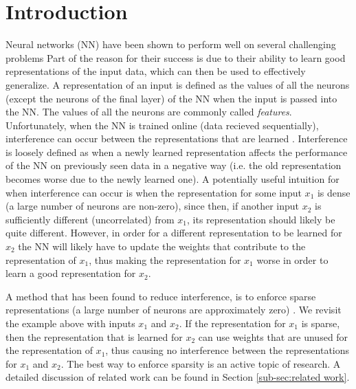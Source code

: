\documentclass{article}
\begin{document}
\section{Introduction} \label{sec:intro}
Neural networks (NN) have been shown to perform well on several challenging problems \cite{brown2020language,krizhevsky2017imagenet,mnih2013playing,silver2017mastering}
Part of the reason for their success is due to their ability to learn good representations of the input data, which can then be used to effectively generalize.
A representation of an input is defined as the values of all the neurons (except the neurons of the final layer) of the NN when the input is passed into the NN.
The values of all the neurons are commonly called \textit{features}.
Unfortunately, when the NN is trained online (data recieved sequentially), interference can occur between the representations that are learned \cite[]{chandak2019learning,caselles2018continual,madjiheurem2019representation}.
Interference is loosely defined as when a newly learned representation affects the performance of the NN on previously seen data in a negative way (i.e. the old representation becomes worse due to the newly learned one).
A potentially useful intuition for when interference can occur is when the representation for some input $x_1$ is dense (a large number of neurons are non-zero),
since then, if another input $x_2$ is sufficiently different (uncorrelated) from $x_1$, its representation should likely be quite different.
However, in order for a different representation to be learned for $x_2$ the NN will likely have to update the weights that contribute to the representation of $x_1$,
thus making the representation for $x_1$ worse in order to learn a good representation for $x_2$.

A method that has been found to reduce interference, is to enforce sparse representations (a large number of neurons are approximately zero) \cite[]{liu2019,javed2019,rafati2019learning}.
We revisit the example above with inputs $x_1$ and $x_2$.
If the representation for $x_1$ is sparse, then the representation that is learned for $x_2$ can use weights that are unused for the representation of $x_1$,
thus causing no interference between the representations for $x_1$ and $x_2$.
The best way to enforce sparsity is an active topic of research.
A detailed discussion of related work can be found in Section \ref{sub-sec:related work}.
\end{document}
